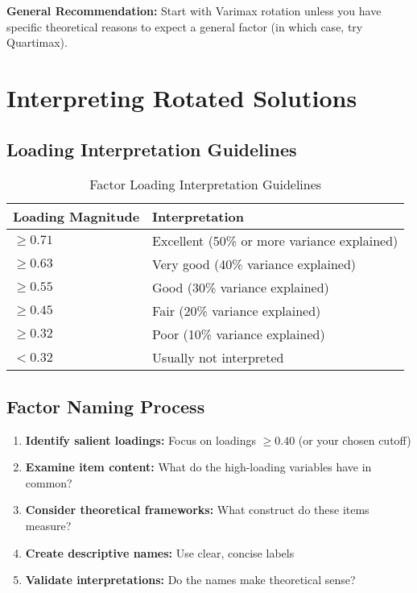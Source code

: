 \documentclass[a4paper]{tufte-book}
\begin{document}
\textbf{General Recommendation:} Start with Varimax rotation unless you have specific theoretical reasons to expect a general factor (in which case, try Quartimax).

\section{Interpreting Rotated Solutions}

\subsection{Loading Interpretation Guidelines}

\begin{table}[h]
\centering
\caption{Factor Loading Interpretation Guidelines}
\begin{tabular}{@{}ll@{}}
\toprule
\textbf{Loading Magnitude} & \textbf{Interpretation} \\
\midrule
$\geq 0.71$ & Excellent (50\% or more variance explained) \\
$\geq 0.63$ & Very good (40\% variance explained) \\
$\geq 0.55$ & Good (30\% variance explained) \\
$\geq 0.45$ & Fair (20\% variance explained) \\
$\geq 0.32$ & Poor (10\% variance explained) \\
$< 0.32$ & Usually not interpreted \\
\bottomrule
\end{tabular}
\end{table}

\subsection{Factor Naming Process}

\begin{enumerate}
\item \textbf{Identify salient loadings:} Focus on loadings $\geq 0.40$ (or your chosen cutoff)
\item \textbf{Examine item content:} What do the high-loading variables have in common?
\item \textbf{Consider theoretical frameworks:} What construct do these items measure?
\item \textbf{Create descriptive names:} Use clear, concise labels
\item \textbf{Validate interpretations:} Do the names make theoretical sense?
\end{enumerate}
\end{document}
